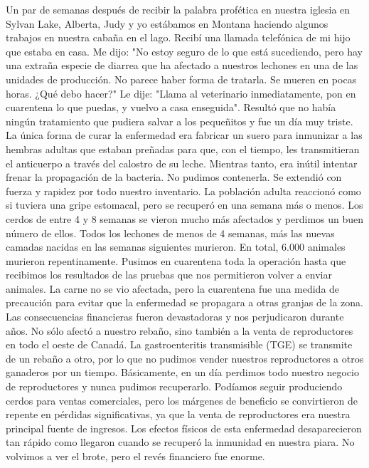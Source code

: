 \documentclass[twoside, 12pt]{book}
\begin{document}
Un par de semanas después de recibir la palabra profética en nuestra iglesia en Sylvan Lake, Alberta, Judy y yo estábamos en Montana haciendo algunos trabajos en nuestra cabaña en el lago. Recibí una llamada telefónica de mi hijo que estaba en casa. Me dijo: "No estoy seguro de lo que está sucediendo, pero hay una extraña especie de diarrea que ha afectado a nuestros lechones en una de las unidades de producción. No parece haber forma de tratarla. Se mueren en pocas horas. ¿Qué debo hacer?" Le dije: "Llama al veterinario inmediatamente, pon en cuarentena lo que puedas, y vuelvo a casa enseguida". Resultó que no había ningún tratamiento que pudiera salvar a los pequeñitos y fue un día muy triste. La única forma de curar la enfermedad era fabricar un suero para inmunizar a las hembras adultas que estaban preñadas para que, con el tiempo, les transmitieran el anticuerpo a través del calostro de su leche. Mientras tanto, era inútil intentar frenar la propagación de la bacteria. No pudimos contenerla. Se extendió con fuerza y rapidez por todo nuestro inventario. La población adulta reaccionó como si tuviera una gripe estomacal, pero se recuperó en una semana más o menos. Los cerdos de entre 4 y 8 semanas se vieron mucho más afectados y perdimos un buen número de ellos. Todos los lechones de menos de 4 semanas, más las nuevas camadas nacidas en las semanas siguientes murieron. En total, 6.000 animales murieron repentinamente. Pusimos en cuarentena toda la operación hasta que recibimos los resultados de las pruebas que nos permitieron volver a enviar animales. La carne no se vio afectada, pero la cuarentena fue una medida de precaución para evitar que la enfermedad se propagara a otras granjas de la zona.\\

Las consecuencias financieras fueron devastadoras y nos perjudicaron durante años. No sólo afectó a nuestro rebaño, sino también a la venta de reproductores en todo el oeste de Canadá. La gastroenteritis transmisible (TGE) se transmite de un rebaño a otro, por lo que no pudimos vender nuestros reproductores a otros ganaderos por un tiempo. Básicamente, en un día perdimos todo nuestro negocio de reproductores y nunca pudimos recuperarlo. Podíamos seguir produciendo cerdos para ventas comerciales, pero los márgenes de beneficio se convirtieron de repente en pérdidas significativas, ya que la venta de reproductores era nuestra principal fuente de ingresos. Los efectos físicos de esta enfermedad desaparecieron tan rápido como llegaron cuando se recuperó la inmunidad en nuestra piara. No volvimos a ver el brote, pero el revés financiero fue enorme.\\
\end{document}
